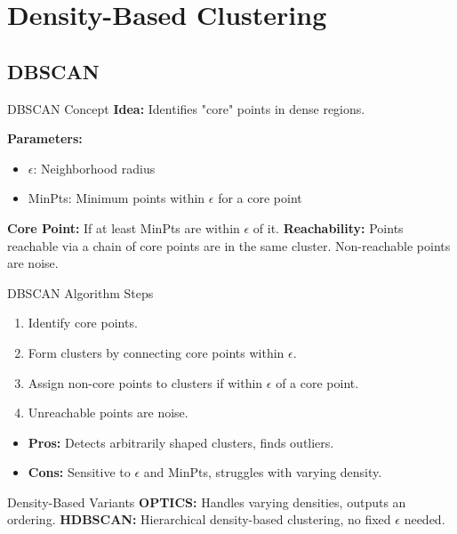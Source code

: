 \documentclass{beamer}
\begin{document}
\section{Density-Based Clustering}
\subsection{DBSCAN}
\begin{frame}{DBSCAN Concept}
    \textbf{Idea:} Identifies "core" points in dense regions.
    
    \textbf{Parameters:}
    \begin{itemize}
        \item $\epsilon$: Neighborhood radius
        \item MinPts: Minimum points within $\epsilon$ for a core point
    \end{itemize}
    
    \textbf{Core Point:} If at least MinPts are within $\epsilon$ of it.  
    \textbf{Reachability:} Points reachable via a chain of core points are in the same cluster.  
    Non-reachable points are noise.
\end{frame}

\begin{frame}{DBSCAN Algorithm Steps}
    \begin{enumerate}
        \item Identify core points.
        \item Form clusters by connecting core points within $\epsilon$.
        \item Assign non-core points to clusters if within $\epsilon$ of a core point.
        \item Unreachable points are noise.
    \end{enumerate}
    
    \begin{itemize}
        \item \textbf{Pros:} Detects arbitrarily shaped clusters, finds outliers.  
        \item \textbf{Cons:} Sensitive to $\epsilon$ and MinPts, struggles with varying density.    
    \end{itemize}
\end{frame}

\begin{frame}{Density-Based Variants}
    \textbf{OPTICS:} Handles varying densities, outputs an ordering.  
    \textbf{HDBSCAN:} Hierarchical density-based clustering, no fixed $\epsilon$ needed.
\end{frame}
\end{document}
